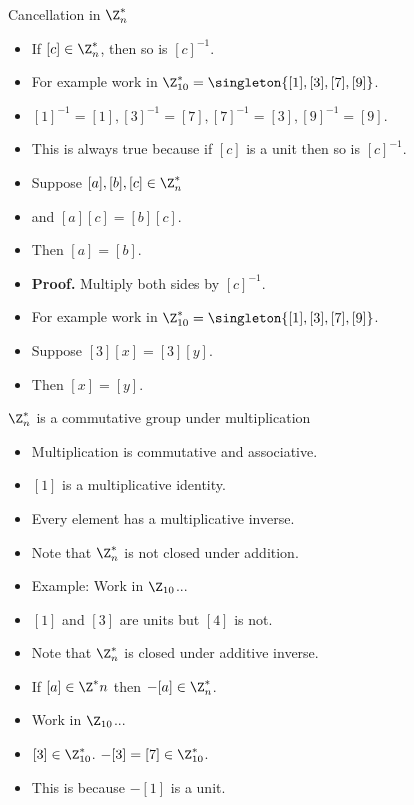 \documentclass{beamer}
\begin{document}
\begin{frame}{Cancellation in $\Z^*_n$}

\begin{itemize}
  \item If $[c]\in\Z_n^*$, then so is $[c]^{-1}$.
  \item For example work in  $\Z_{10}^* = \singleton{[1],[3],[7],[9]}$.
  \item $[1]^{-1} = [1], [3]^{-1}=[7], [7]^{-1} = [3], [9]^{-1} = [9]$.
  \item This is always true because if $[c]$ is a unit then so is $[c]^{-1}$.
  \item Suppose $[a],[b],[c] \in \Z_n^*$
  \item and $[a][c] = [b][c]$.
  \item Then $[a] = [b]$.
  \item \textbf{Proof.} Multiply both sides by $[c]^{-1}$.
  \item For example work in  $\Z_{10}^* = \singleton{[1],[3],[7],[9]}$.
  \item Suppose $[3][x] = [3][y]$.
  \item Then $[x] = [y]$.
\end{itemize}

\end{frame}

\begin{frame}{$\Z^*_n$ is a commutative group under multiplication}

\begin{itemize}
  \item Multiplication is commutative and associative.
  \item $[1]$ is a multiplicative identity.
  \item Every element has a multiplicative inverse.
  \item Note that $\Z^*_n$ is not closed under addition.
  \item Example: Work in $\Z_{10}$...
  \item $[1]$ and $[3]$ are units but $[4]$ is not.
  \item Note that $\Z^*_n$ is closed under additive inverse.
  \item If $[a]\in\Z^*n$ then $-[a]\in\Z^*_n$.
  \item Work in $\Z_{10}$...
  \item $[3]\in\Z^*_{10}$. $-[3]=[7]\in\Z^*_{10}$.
  \item This is because $-[1]$ is a unit.
\end{itemize}

\end{frame}
\end{document}
